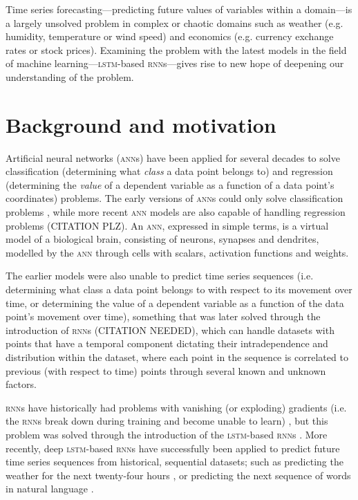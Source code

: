 Time series forecasting---predicting future values of variables within a domain---is a largely unsolved problem in complex or chaotic domains such as weather (e.g. humidity, temperature or wind speed) and economics (e.g. currency exchange rates or stock prices). Examining the problem with the latest models in the field of machine learning---\textsc{lstm}-based \textsc{rnn}s---gives rise to new hope of deepening our understanding of the problem.

\section{Background and motivation}
Artificial neural networks (\textsc{ann}s) have been applied for several decades to solve classification (determining what \textit{class} a data point belongs to) and regression (determining the \textit{value} of a dependent variable as a function of a data point's coordinates) problems. The early versions of \textsc{ann}s could only solve classification problems \citep{rosenblatt1958}, while more recent \textsc{ann} models are also capable of handling regression problems (CITATION PLZ). An \textsc{ann}, expressed in simple terms, is a virtual model of a biological brain, consisting of neurons, synapses and dendrites, modelled by the \textsc{ann} through cells with scalars, activation functions and weights.

The earlier models were also unable to predict time series sequences (i.e. determining what class a data point belongs to with respect to its movement over time, or determining the value of a dependent variable as a function of the data point's movement over time), something that was later solved through the introduction of \textsc{rnn}s (CITATION NEEDED), which can handle datasets with points that have a temporal component dictating their intradependence and distribution within the dataset, where each point in the sequence is correlated to previous (with respect to time) points through several known and unknown factors.

\textsc{rnn}s have historically had problems with vanishing (or exploding) gradients (i.e. the \textsc{rnn}s break down during training and become unable to learn) \citep{pascanu2012}, but this problem was solved through the introduction of the \textsc{lstm}-based \textsc{rnn}s \citep*{hochreiter1997}. More recently, deep \textsc{lstm}-based \textsc{rnn}s have successfully been applied to predict future time series sequences from historical, sequential datasets; such as predicting the weather for the next twenty-four hours \citep*{zaytar2016}, or predicting the next sequence of words in natural language \citep*{quoc2014}.

